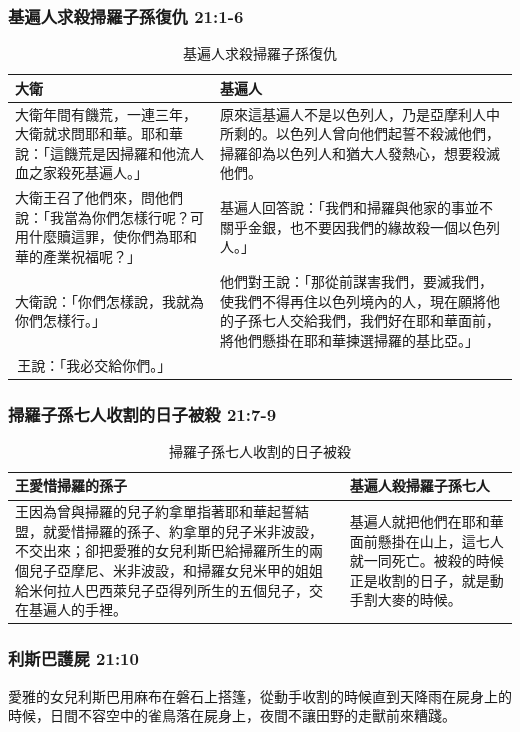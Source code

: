 \subsubsection{基遍人求殺掃羅子孫復仇 21:1-6}
\begin{table}[H]
\hspace*{-10mm}
\centering 
\begin{tabular}{p{8.5cm}|p{9.25cm}}\hline\hline
大衛&基遍人\\\hline
大衛年間有饑荒，一連三年，大衛就求問耶和華。耶和華說：「這饑荒是因掃羅和他流人血之家殺死基遍人。」
&原來這基遍人不是以色列人，乃是亞摩利人中所剩的。以色列人曾向他們起誓不殺滅他們，掃羅卻為以色列人和猶大人發熱心，想要殺滅他們。\\\hline
大衛王召了他們來，問他們說：「我當為你們怎樣行呢？可用什麼贖這罪，使你們為耶和華的產業祝福呢？」&基遍人回答說：「我們和掃羅與他家的事並不關乎金銀，也不要因我們的緣故殺一個以色列人。」\\\hline
大衛說：「你們怎樣說，我就為你們怎樣行。」&他們對王說：「那從前謀害我們，要滅我們，使我們不得再住以色列境內的人，現在願將他的子孫七人交給我們，我們好在耶和華面前，將他們懸掛在耶和華揀選掃羅的基比亞。」\\\hline
 王說：「我必交給你們。」&\\\hline
\end{tabular}
\caption{基遍人求殺掃羅子孫復仇}
\end{table}

\subsubsection{掃羅子孫七人收割的日子被殺 21:7-9}
\begin{table}[H]
\hspace*{-7mm}
\centering 
\begin{tabular}{p{}|p{5.8cm}}\hline\hline
王愛惜掃羅的孫子&基遍人殺掃羅子孫七人\\\hline
王因為曾與掃羅的兒子約拿單指著耶和華起誓結盟，就愛惜掃羅的孫子、約拿單的兒子米非波設，不交出來；卻把愛雅的女兒利斯巴給掃羅所生的兩個兒子亞摩尼、米非波設，和掃羅女兒米甲的姐姐給米何拉人巴西萊兒子亞得列所生的五個兒子，交在基遍人的手裡。
&基遍人就把他們在耶和華面前懸掛在山上，這七人就一同死亡。被殺的時候正是收割的日子，就是動手割大麥的時候。\\\hline
\end{tabular}
\caption{掃羅子孫七人收割的日子被殺}
\end{table}


\subsubsection{利斯巴護屍 21:10}
愛雅的女兒利斯巴用麻布在磐石上搭篷，從動手收割的時候直到天降雨在屍身上的時候，日間不容空中的雀鳥落在屍身上，夜間不讓田野的走獸前來糟踐。

